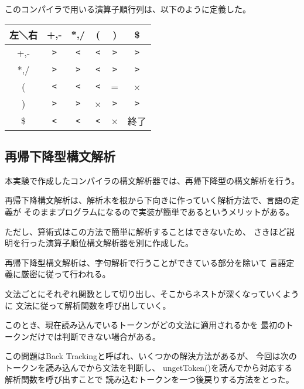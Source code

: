 \documentclass[11pt,a4j]{jarticle}
\begin{document}
\vspace{0.2in}

このコンパイラで用いる演算子順行列は、以下のように定義した。

\begin{table}[h]
\centering
\begin{tabular}{|c|c|c|c|c|c|}\hline
左＼右 & +,- & *,/ & ( & ) & \$\\ \hline
+,- & \verb|>| & \verb|<| & \verb|<| & \verb|>| & \verb|>| \\ \hline
*,/ & \verb|>| & \verb|>| & \verb|<| & \verb|>| & \verb|>| \\ \hline
( & \verb|<| & \verb|<| & \verb|<| & = & × \\ \hline
) & \verb|>| & \verb|>| & × & \verb|>| & \verb|>| \\ \hline
\$ & \verb|<| & \verb|<| & \verb|<| & × & 終了 \\ \hline
\end{tabular}
\end{table}


\subsection{再帰下降型構文解析}

本実験で作成したコンパイラの構文解析器では、再帰下降型の構文解析を行う。

再帰下降構文解析は、解析木を根から下向きに作っていく解析方法で、言語の定義が
そのままプログラムになるので実装が簡単であるというメリットがある。

ただし、算術式はこの方法で簡単に解析することはできないため、
さきほど説明を行った演算子順位構文解析器を別に作成した。

再帰下降型構文解析は、字句解析で行うことができている部分を除いて
言語定義に厳密に従って行われる。

文法ごとにそれぞれ関数として切り出し、そこからネストが深くなっていくように
文法に従って解析関数を呼び出していく。

\vspace{0.2in}

このとき、現在読み込んでいるトークンがどの文法に適用されるかを
最初のトークンだけでは判断できない場合がある。

この問題はBack Trackingと呼ばれ、いくつかの解決方法があるが、
今回は次のトークンを読み込んでから文法を判断し、
ungetToken()を読んでから対応する解析関数を呼び出すことで
読み込むトークンを一つ後戻りする方法をとった。

\vspace{0.2in}
\end{document}
